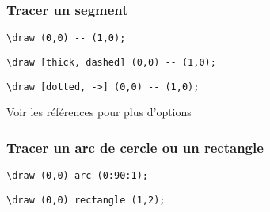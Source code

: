 \documentclass{clic_latex_beamer}
\begin{document}
\begin{frame}[fragile]
\frametitle{Tracer un segment}


\begin{lstlisting}
\draw (0,0) -- (1,0);
\end{lstlisting}

\pause


\begin{lstlisting}
\draw [thick, dashed] (0,0) -- (1,0);
\end{lstlisting}


\begin{lstlisting}
\draw [dotted, ->] (0,0) -- (1,0);
\end{lstlisting}

Voir les références pour plus d'options

\end{frame}

\begin{frame}[fragile]
\frametitle{Tracer un arc de cercle ou un rectangle}

\begin{multicols}{2}

\begin{lstlisting}
\draw (0,0) arc (0:90:1);
\end{lstlisting}

\columnbreak
\pause



\begin{lstlisting}
\draw (0,0) rectangle (1,2);
\end{lstlisting}

\end{multicols}

\end{frame}
\end{document}
